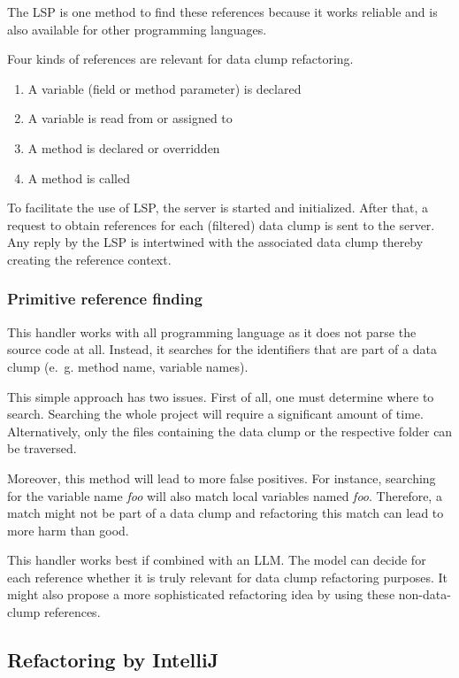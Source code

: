 The \ac{LSP} is one method to find these references because it works reliable and is also available for other programming languages.

Four kinds of references are relevant for data clump refactoring.

\begin{enumerate}
     \item A  variable (field or method parameter)  is declared
    \item A variable is read from or assigned to
   
    \item A method is declared or overridden
    \item A method is called
\end{enumerate}
To facilitate the use of \ac{LSP}, the server is started and initialized. After that, a request to obtain references for each (filtered) data clump is sent to the server.
Any reply by the \ac{LSP} is intertwined with the associated data clump thereby creating the reference context.

 
\subsubsection{Primitive reference finding}
This handler works with all programming language as it does not parse the source code at all. Instead, it searches for the identifiers that are part of a data clump (e.~g. method name, variable names). 

This simple approach has two issues. First of all, one must determine where to search. Searching the whole project will require a significant amount of time. Alternatively, only the files containing the data clump or the respective folder can be traversed.

Moreover, this method will lead to more false positives. For instance, searching for the variable name \textit{foo} will also match local variables named \textit{foo}. Therefore, a match might not be part of a data clump and refactoring this match can lead to more harm than good. 

This handler works best if combined with an \ac{LLM}. The model can decide for each reference whether it is truly relevant for data clump refactoring purposes. It might also propose a more sophisticated refactoring idea by using these non-data-clump references. 

\subsection{Refactoring by IntelliJ} \label{sec:intellij_refactoring}

